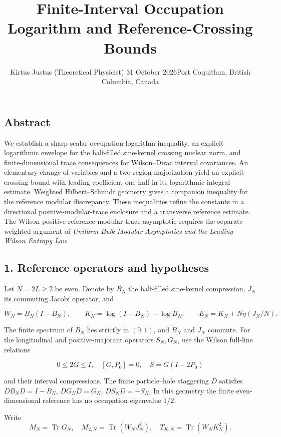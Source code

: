 \documentclass[
  10pt,
  a4paper,
]{article}
\title{Finite-Interval Occupation Logarithm and Reference-Crossing Bounds}
\author{Kirtus Justus (Theoretical Physicist) \textbullet{} 31 October 2026\tabularnewline Port Coquitlam, British Columbia, Canada}
\date{}
\begin{document}
\maketitle

\subsection{Abstract}\label{abstract}

We establish a sharp scalar occupation-logarithm inequality, an explicit logarithmic envelope for the half-filled sine-kernel crossing nuclear norm, and finite-dimensional trace consequences for Wilson--Dirac interval covariances. An elementary change of variables and a two-region majorization yield an explicit crossing bound with leading coefficient one-half in its logarithmic integral estimate. Weighted Hilbert--Schmidt geometry gives a companion inequality for the reference modular discrepancy. These inequalities refine the constants in a directional positive-modular-trace enclosure and a transverse reference estimate. The Wilson positive reference-modular trace asymptotic requires the separate weighted argument of \emph{Uniform Bulk Modular Asymptotics and the Leading Wilson Entropy Law}.

\subsection{1. Reference operators and hypotheses}\label{reference-operators-and-hypotheses}

Let \(N=2L\ge2\) be even. Denote by \(B_N\) the half-filled sine-kernel compression, \(J_N\) its commuting Jacobi operator, and

\[
W_N=B_N(I-B_N),\qquad
K_N=\log(I-B_N)-\log B_N,\qquad
E_N=K_N+N\eta(J_N/N).
\]

The finite spectrum of \(B_N\) lies strictly in \((0,1)\), and \(B_N\) and \(J_N\) commute. For the longitudinal and positive-majorant operators \(S_N,G_N\), use the Wilson full-line relations

\[
0\le2G\le I,\quad [G,P_0]=0,\quad S=G(I-2P_0)
\]

and their interval compressions. The finite particle--hole staggering \(D\) satisfies \(DB_ND=I-B_N\), \(DG_ND=G_N\), \(DS_ND=-S_N\). In this geometry the finite even-dimensional reference has no occupation eigenvalue \(1/2\).

Write \[
M_N=\operatorname{Tr}G_N,
\quad M_{2,N}=\operatorname{Tr}(W_NJ_N^2),
\quad T_{K,N}=\operatorname{Tr}(W_NK_N^2).
\]
\end{document}
